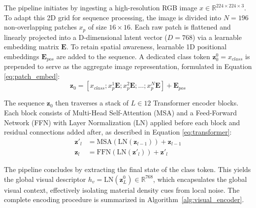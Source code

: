 \documentclass[journal,twoside,web]{ieeecolor}
\begin{document}
The pipeline initiates by ingesting a high-resolution RGB image $x \in \mathbb{R}^{224 \times 224 \times 3}$. To adapt this 2D grid for sequence processing, the image is divided into $N=196$ non-overlapping patches $x_p$ of size $16 \times 16$. Each raw patch is flattened and linearly projected into a D-dimensional latent vector ($D=768$) via a learnable embedding matrix $\mathbf{E}$. To retain spatial awareness, learnable 1D positional embeddings $\mathbf{E}_{pos}$ are added to the sequence. A dedicated class token $\mathbf{z}_{0}^0 = x_{class}$ is prepended to serve as the aggregate image representation, formulated in Equation \eqref{eq:patch_embed}:
\begin{equation} \label{eq:patch_embed}
    \mathbf{z}_0 = [x_{class}; x_p^1\mathbf{E}; x_p^2\mathbf{E}; \dots; x_p^N\mathbf{E}] + \mathbf{E}_{pos}
\end{equation}

The sequence $\mathbf{z}_0$ then traverses a stack of $L \in 12$ Transformer encoder blocks. Each block consists of Multi-Head Self-Attention (MSA) and a Feed-Forward Network (FFN) with Layer Normalization (LN) applied before each block and residual connections added after, as described in Equation \eqref{eq:transformer}:
\begin{equation} \label{eq:transformer}
\begin{split}
    \mathbf{z}'_l &= \text{MSA}(\text{LN}(\mathbf{z}_{l-1})) + \mathbf{z}_{l-1} \\
    \mathbf{z}_l &= \text{FFN}(\text{LN}(\mathbf{z}'_l)) + \mathbf{z}'_l
\end{split}
\end{equation}

The pipeline concludes by extracting the final state of the class token. This yields the global visual descriptor $h_v = \text{LN}(\mathbf{z}_L^0) \in \mathbb{R}^{768}$, which encapsulates the global visual context, effectively isolating material density cues from local noise. The complete encoding procedure is summarized in Algorithm~\ref{alg:visual_encoder}.
\end{document}
